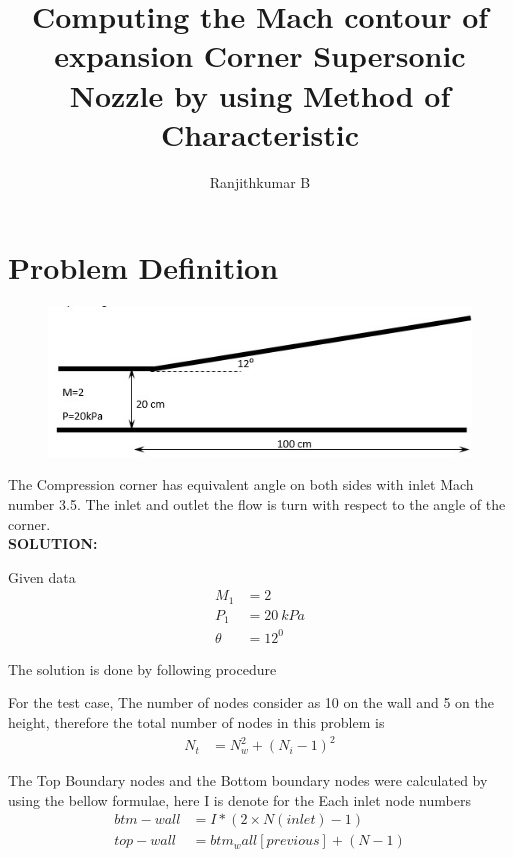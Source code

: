\documentclass[conf]{new-aiaa}
\title{Computing the Mach contour of expansion Corner Supersonic Nozzle by using Method of Characteristic}
\author{Ranjithkumar B}
\begin{document}
\maketitle

\section{Problem Definition}

\begin{figure}[!h]
	\centering
	\includegraphics[scale=0.5]{results/question.png}
\end{figure}

\par The Compression corner has equivalent angle on both sides with inlet Mach number 3.5. The inlet and outlet the flow is turn with respect to the angle of the corner.\\

\textbf{SOLUTION:}\\

\par Given data
\begin{align*}
	M_1 &= 2 \\
	P_1 &= 20 \ kPa \\
	\theta & = 12^0
\end{align*}

\par The solution is done by following procedure\\

\par For the test case, The number of nodes consider as 10 on the wall and 5 on the height, therefore the total number of nodes in this problem is  \\
\begin{align*}
	N_{t} & = N_w^2+(N_i-1)^2
\end{align*}
\par The Top Boundary nodes and the Bottom boundary nodes were calculated by using the bellow formulae, here I is denote for the Each inlet node numbers
\begin{align*}
	btm-wall & = I*(2 \times N(inlet)-1) \\
	top-wall & = btm_wall[previous] + (N -1) \\
\end{align*}
\end{document}
